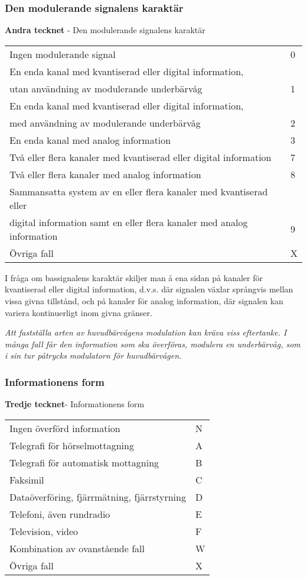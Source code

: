 \subsubsection{Den modulerande signalens karaktär}
\textbf{Andra tecknet} - Den modulerande signalens karaktär\\
\begin{tabular}{ll}
	Ingen modulerande signal & 0\\
	En enda kanal med kvantiserad eller digital information, &\\
	utan användning av modulerande underbärvåg & 1\\
	En enda kanal med kvantiserad eller digital information, &\\
	med användning av modulerande underbärvåg & 2\\
	En enda kanal med analog information & 3\\
	Två eller flera kanaler med kvantiserad eller digital information & 7\\
	Två eller flera kanaler med analog information & 8\\
	Sammansatta system av en eller flera kanaler med kvantiserad eller & \\
	digital information samt en eller flera kanaler med analog information & 9\\
	Övriga fall & X\\
\end{tabular}

I fråga om bassignalens karaktär skiljer
man å ena sidan på kanaler för kvantiserad eller digital information, d.v.s. där
signalen växlar språngvis mellan vissa givna tillstånd, och på kanaler för
analog information, där signalen kan variera kontinuerligt inom givna gränser.

\emph{Att fastställa arten av huvudbärvågens modulation kan kräva viss
	eftertanke. I många fall får den information som ska överföras, modulera en
	underbärvåg, som i sin tur påtrycks modulatorn för huvudbärvågen.}

\subsubsection{Informationens form}
\textbf{Tredje tecknet}- Informationens form\\
\begin{tabular}{ll}
	Ingen överförd information & N\\
	Telegrafi för hörselmottagning & A\\
	Telegrafi för automatisk mottagning & B\\
	Faksimil & C\\
	Dataöverföring, fjärrmätning, fjärrstyrning & D\\
	Telefoni, även rundradio & E\\
	Television, video & F\\
	Kombination av ovanstående fall & W\\
	Övriga fall & X\\
\end{tabular}

